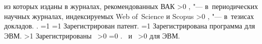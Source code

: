 {\begin{refsection}
         из которых изданы в журналах, рекомендованных ВАК\sloppy%
        \ifnum \value{citeauthorscopuswos}>0%
            ,  "--- в~периодических научных журналах, индексируемых Web of~Science и Scopus\sloppy%
        \fi%
        \ifnum \value{citeauthorconf}>0%
            ,  "--- в~тезисах докладов.
        \else%
            .
        \fi%
        \ifnum \value{citeregistered}=1%
            \ifnum \value{citeauthorpatent}=1%
                Зарегистрирован  патент.
            \fi%
            \ifnum \value{citeauthorprogram}=1%
                Зарегистрирована  программа для ЭВМ.
            \fi%
        \fi%
        \ifnum \value{citeregistered}>1%
            Зарегистрированы\ %
            \ifnum \value{citeauthorpatent}>0%
            \sloppy%
            \ifnum \value{citeauthorprogram}=0 . \else \ и~\fi%
            \fi%
            \ifnum \value{citeauthorprogram}>0%
             для ЭВМ.
            \fi%
        \fi%
    \end{refsection}%
    \begin{refsection}
    \end{refsection}%
}